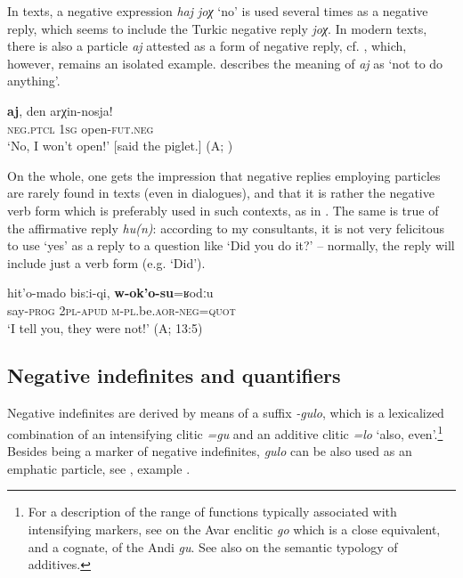 \documentclass[output=paper,colorlinks=true, citecolor=brown]{langscibook}
\begin{document}
In  texts, a negative expression \textit{haj joχ} ‘no’ is used several times as a negative reply, which seems to include the Turkic negative reply \textit{joχ}. In modern texts, there is also a particle \textit{aj} attested as a form of negative reply, cf. , which, however, remains an isolated example. \citet[245]{Salimov2010} describes the meaning of \textit{aj} as ‘not to do anything’.

\ea\label{ex:and:48}
    \begin{xlist}
    \label{ex:and:48A} 
    \label{ex:and:48B}
        \gll  \textbf{aj}, den arχin{}-nosja!\\ 
               \textsc{neg.ptcl} \textsc{1sg} open-\textsc{fut.neg}\\
        \glt ‘No, I won’t open!’ [said the piglet.] (A; )
    \end{xlist}
\z 

On the whole, one gets the impression that negative replies employing particles are rarely found in texts (even in dialogues), and that it is rather the negative verb form which is preferably used in such contexts, as in . The same is true of the affirmative reply \textit{hu(n)}: according to my consultants, it is not very felicitous to use ‘yes’ as a reply to a question like ‘Did you do it?’ – normally, the reply will include just a verb form (e.g. ‘Did’). 

\ea\label{ex:and:49}
    \begin{xlist}
    \label{ex:and:49A} 
    \label{ex:and:49B}
        \gll  hit’o{}-mado bisːi{}-qi, \textbf{w{}-ok’o{}-su}=ʁodːu\\ 
               say-\textsc{prog} \textsc{2pl{}-apud} \textsc{m}{}-\textsc{pl.}be\textsc{.aor-neg=quot}\\
        \glt ‘I tell you, they were not!’ (A;  13:5)
    \end{xlist}
\z 

\subsection{Negative indefinites and quantifiers} \label{sec:and:3.2}

Negative indefinites are derived by means of a suffix \textit{{}-gulo}, which is a lexicalized combination of an intensifying clitic \textit{=gu} and an additive clitic \textit{=lo} ‘also, even’.\footnote{For a description of the range of functions typically associated with intensifying markers, see \citet{Forker2015} on the Avar enclitic \textit{go} which is a close equivalent, and a cognate, of the Andi \textit{gu}. See also \citet{Forker2016} on the semantic typology of additives.} Besides being a marker of negative indefinites, \textit{gulo} can be also used as an emphatic particle, see , example .
\end{document}
